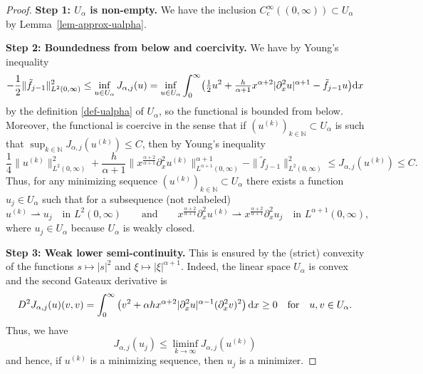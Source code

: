 \documentclass[reqno,12pt]{amsart}
\renewcommand{\d}{\ensuremath{\mathrm{d}}}
\newcommand{\N}{\ensuremath{\mathbb{N}}}
\renewcommand{\d}{\ensuremath{{\rm d}}}
\numberwithin{equation}{section}
\begin{document}
%
\begin{proof}
\textbf{Step 1: $U_\alpha$ is non-empty. } We have the inclusion $C^\infty_\mathrm{c}((0,\infty)) \subset U_\alpha$ by Lemma~\ref{lem-approx-ualpha}.

%
\bigskip
%

\textbf{Step 2: Boundedness from below and coercivity.} We have by Young's inequality
\begin{equation*}
    - \frac 1 2 \|\tilde f_{j-1}\|_{L^2(0,\infty)}^2 %
    \leq
    \inf_{u \in U_\alpha} J_{\alpha,j}(u)
    =
    \inf_{u \in U_\alpha}  \int_0^\infty \bigl(\tfrac{1}{2}u^2 + \tfrac{h}{\alpha+1} x^{\alpha+2} |\partial_x^2 u|^{\alpha+1} - \tilde f_{j-1} u\bigr) \d x 
\end{equation*}
by the definition \eqref{def-ualpha} of $U_\alpha$, so the functional is bounded from below.
Moreover, the functional is coercive in the sense that if $(u^{(k)})_{k \in \N} \subset U_\alpha$ is such that $\sup_{k \in \N} J_{\alpha,j}(u^{(k)}) \le C$, then by Young's inequality
%
\begin{equation*}
    \frac 1 4 \|u^{(k)}\|_{L^2(0,\infty)}^2
    +
    \frac{h}{\alpha+1}\|x^\frac{\alpha+2}{\alpha+1} \partial_x^2 u^{(k)}\|_{L^{\alpha+1}(0,\infty)}^{\alpha+1}
    - \|\tilde{f}_{j-1}\|_{L^2(0,\infty)}^2
    \leq 
    J_{\alpha,j}(u^{(k)}) 
    \le C.
\end{equation*}
%
Thus, for any minimizing sequence $(u^{(k)})_{k \in \N} \subset U_\alpha$ there exists a function $u_j \in U_\alpha$ such that for a subsequence (not relabeled)
%
\begin{equation*}
u^{(k)} \rightharpoonup u_j \quad \text{in } L^2(0,\infty)
    \qquad \text{and} \qquad
    x^{\frac{\alpha+2}{\alpha+1}} \partial_x^2 u^{(k)} \rightharpoonup x^{\frac{\alpha+2}{\alpha+1}} \partial_x^2 u_j
    \quad \text{in } L^{\alpha+1}(0,\infty),
\end{equation*}
%
where $u_j\in U_\alpha$ because $U_\alpha$ is weakly closed.

%
\bigskip
%

\textbf{Step 3: Weak lower semi-continuity. } 
This is ensured by the (strict) convexity of the functions $s \mapsto |s|^2$ and $\xi \mapsto |\xi|^{\alpha+1}$. Indeed, the linear space $U_\alpha$ is convex and the second Gateaux derivative is
%
\begin{equation}\label{second_ja}
    D^2 J_{\alpha,j}(u)(v,v) = \int_0^\infty \big( v^2 + \alpha h x^{\alpha+2} |\partial_x^2 u|^{\alpha-1} (\partial_x^2 v)^2\big) \, \d x \ge 0 \quad \text{for} \quad u,v \in U_\alpha.
\end{equation}
Thus, we have
\begin{equation*}
    J_{\alpha,j}(u_j) \leq \liminf_{k \to \infty} J_{\alpha,j}(u^{(k)})
\end{equation*}
and hence, if $u^{(k)}$ is a minimizing sequence, then $u_j$ is a minimizer.


\end{proof}
\end{document}

